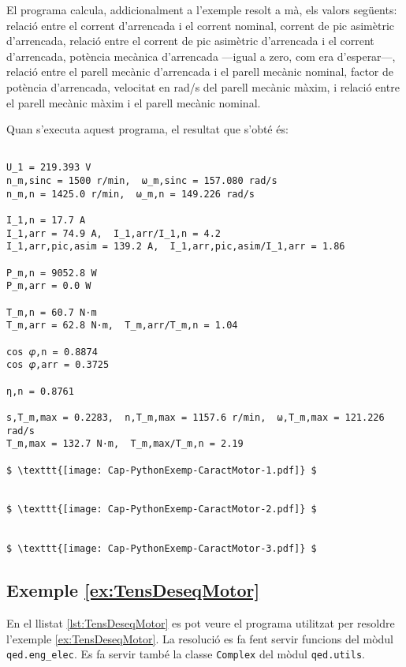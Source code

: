 El programa calcula, addicionalment a l'exemple resolt a mà, els valors següents:
relació entre el corrent d'arrencada i el corrent nominal, 
corrent de pic asimètric d'arrencada,
relació entre el corrent de pic asimètric d'arrencada i el corrent d'arrencada,
potència mecànica d'arrencada ---igual a zero, com era d'esperar---,
relació entre el parell mecànic d'arrencada i el parell mecànic nominal,
factor de potència d'arrencada,
velocitat en rad/s del parell mecànic màxim, i
relació entre el parell mecànic màxim i el parell mecànic nominal.


Quan s'executa aquest programa, el resultat que s'obté és:
\lstset{
	language=,
	numbers=none,
	frame=none
}

\begin{lstlisting}[mathescape=true]
	
U_1 = 219.393 V
n_m,sinc = 1500 r/min,  ω_m,sinc = 157.080 rad/s
n_m,n = 1425.0 r/min,  ω_m,n = 149.226 rad/s

I_1,n = 17.7 A
I_1,arr = 74.9 A,  I_1,arr/I_1,n = 4.2
I_1,arr,pic,asim = 139.2 A,  I_1,arr,pic,asim/I_1,arr = 1.86

P_m,n = 9052.8 W
P_m,arr = 0.0 W

T_m,n = 60.7 N·m
T_m,arr = 62.8 N·m,  T_m,arr/T_m,n = 1.04

cos 𝜑,n = 0.8874
cos 𝜑,arr = 0.3725

η,n = 0.8761

s,T_m,max = 0.2283,  n,T_m,max = 1157.6 r/min,  ω,T_m,max = 121.226 rad/s
T_m,max = 132.7 N·m,  T_m,max/T_m,n = 2.19

$ \texttt{[image: Cap-PythonExemp-CaractMotor-1.pdf]} $
      
    
$ \texttt{[image: Cap-PythonExemp-CaractMotor-2.pdf]} $


$ \texttt{[image: Cap-PythonExemp-CaractMotor-3.pdf]} $
\end{lstlisting} 






\hypertarget{exemple:TensDeseqMotor}{\subsection{Exemple \ref*{ex:TensDeseqMotor} \TensDeseqMotor}}
En el llistat \vref{lst:TensDeseqMotor} es pot veure el programa utilitzat per resoldre l'exemple \vref{ex:TensDeseqMotor}. La resolució es fa fent servir funcions del mòdul \texttt{qed.eng\_elec}. Es fa servir també la classe \texttt{Complex} del mòdul \texttt{qed.utils}.


